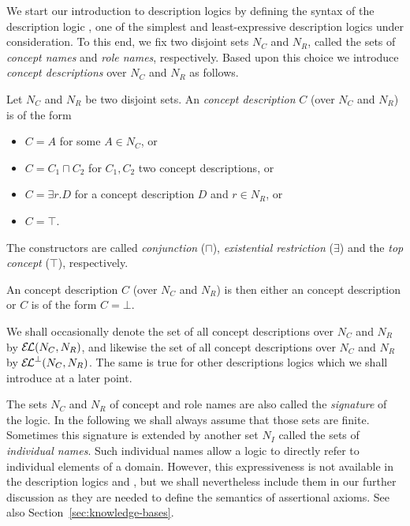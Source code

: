 We start our introduction to description logics by defining the syntax of the description
logic \ELbot, one of the simplest and least-expressive description logics under
consideration.  To this end, we fix two disjoint sets $N_C$ and $N_R$, called the sets of
\emph{concept names} and \emph{role names}, respectively.  Based upon this choice we
introduce \emph{\ELbot concept descriptions} over $N_C$ and $N_R$ as follows.
\begin{Definition}
  \label{def:ELbot-concept-descriptions}
  Let $N_C$ and $N_R$ be two disjoint sets.  An \emph{\EL concept description} $C$ (over
  $N_C$ and $N_R$) is of the form
  \begin{itemize}
  \item $C = A$ for some $A \in N_C$, or
  \item $C = C_1 \sqcap C_2$ for $C_1, C_2$ two \EL concept descriptions, or
  \item $C = \exists r. D$ for a \EL concept description $D$ and $r \in N_R$, or
  \item $C = \top$.
  \end{itemize}
  The constructors are called \emph{conjunction} ($\sqcap$), \emph{existential
    restriction} ($\exists$) and the \emph{top concept} ($\top$), respectively.

  An \ELbot concept description $C$ (over $N_C$ and $N_R$) is then either an \EL concept
  description or $C$ is of the form $C = \bot$.
\end{Definition}

We shall occasionally denote the set of all \EL concept descriptions over $N_C$ and $N_R$
by ${\mathcal{E}\kern-.3ex\mathcal{L}}(N_C, N_R)$, and likewise the set of all \ELbot concept descriptions over $N_C$ and
$N_R$ by ${{\mathcal{E}\kern-.3ex\mathcal{L}}^\bot}(N_C, N_R)$.  The same is true for other descriptions logics which we
shall introduce at a later point.

The sets $N_C$ and $N_R$ of concept and role names are also called the \emph{signature} of
the logic.  In the following we shall always assume that those sets are finite.  Sometimes
this signature is extended by another set $N_I$ called the sets of \emph{individual
  names}.  Such individual names allow a logic to directly refer to individual elements of
a domain.  However, this expressiveness is not available in the description logics \EL and
\ELbot, but we shall nevertheless include them in our further discussion as they are
needed to define the semantics of assertional axioms.  See also
Section~\ref{sec:knowledge-bases}.

